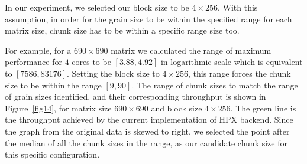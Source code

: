 In our experiment, we selected our block size to be $4\times256$. With this assumption, in order for the grain size to be within the specified range for each matrix size, chunk size has to be within a specific range size too.

For example, for a $690\times690$ matrix we calculated the range of maximum performance for $4$ cores to be $[3.88, 4.92]$ in logarithmic scale which is equivalent to $[7586, 83176]$. Setting the block size to $4\times256$, this range forces the chunk size to be within the range $[9,90]$. The range of chunk sizes to match the range of grain sizes identified, and their corresponding throughput is shown in Figure~\ref{fig14}, for matrix size $690\times690$ and block size $4\times256$. The green line is the throughput achieved by the current implementation of HPX backend. Since the graph from the original data is skewed to right, we selected the point after the median of all the chunk sizes in the range, as our candidate chunk size for this specific configuration.


